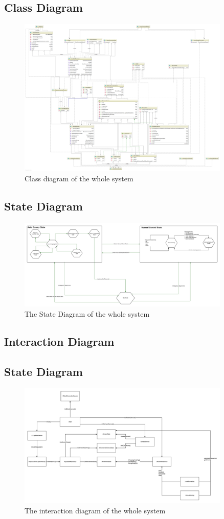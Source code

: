 \subsection{Class Diagram}
\begin{figure}
	\centering
	\includegraphics[width=0.9\textwidth]{ClassDiagram.png}	
	\caption{\label{fig:diagramClasses}Class diagram of the whole system}
\end{figure}	

\subsection{State Diagram}
\begin{figure}
	\centering
	\includegraphics[width=0.9\textwidth]{StateDiagram.png}	
	\caption{\label{fig:diagramState}The State Diagram of the whole system}
\end{figure}	

\subsection{Interaction Diagram}
\subsection{State Diagram}
\begin{figure}
	\centering
	\includegraphics[width=0.9\textwidth]{InteractionDiagram.png}	
	\caption{\label{fig:diagramInteraction}The interaction diagram of the whole system}
\end{figure}	